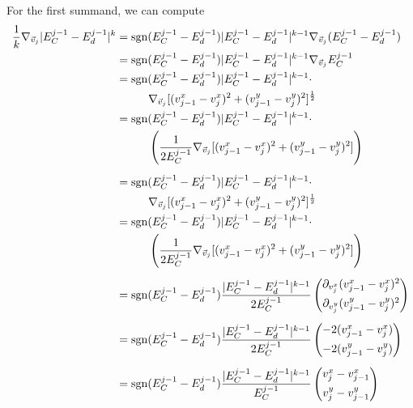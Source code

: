 \begin{proposition}
	For the first summand, we can compute 
	\begin{align*}
		\frac{1}{k} \nabla_{\vec{v}_{j}} |E^{j-1}_{C} - E^{j-1}_d|^k 
		&= \operatorname{sgn}(E^{j-1}_C - E^{j-1}_d) |E^{j-1}_C - E^{j-1}_d|^{k-1} \nabla_{\vec{v}_j} (E^{j-1}_C - E^{j-1}_d) \\
		&= \operatorname{sgn}(E^{j-1}_C - E^{j-1}_d) |E^{j-1}_C - E^{j-1}_d|^{k-1} \nabla_{\vec{v}_j} E^{j-1}_C \\
		&= \operatorname{sgn}(E^{j-1}_C - E^{j-1}_d) |E^{j-1}_C - E^{j-1}_d|^{k-1} \cdot\\
		& \hspace{1cm} \nabla_{\vec{v}_j} [(v_{j-1}^{x} - v_{j}^{x})^2 + (v_{j-1}^{y} - v_{j}^{y})^2]^{\frac{1}{2}}\\
		&= \operatorname{sgn}(E^{j-1}_C - E^{j-1}_d) |E^{j-1}_C - E^{j-1}_d|^{k-1} \cdot    \\
		& \hspace{1cm} \left(\frac{1}{2 E^{j-1}_C} \nabla_{\vec{v}_j} [(v_{j-1}^{x} - v_{j}^{x})^2 + (v_{j-1}^{y} - v_{j}^{y})^2]\right) \\[0.5em] 
		&= \operatorname{sgn}(E^{j-1}_C - E^{j-1}_d) |E^{j-1}_C - E^{j-1}_d|^{k-1} \cdot\\
		& \hspace{1cm} \nabla_{\vec{v}_j} [(v_{j-1}^{x} - v_{j}^{x})^2 + (v_{j-1}^{y} - v_{j}^{y})^2]^{\frac{1}{2}}\\
		&= \operatorname{sgn}(E^{j-1}_C - E^{j-1}_d) |E^{j-1}_C - E^{j-1}_d|^{k-1} \cdot    \\
		& \hspace{1cm} \left(\frac{1}{2 E^{j-1}_C} \nabla_{\vec{v}_j} [(v_{j-1}^{x} - v_{j}^{x})^2 + (v_{j-1}^{y} - v_{j}^{y})^2]\right) \\[0.5em] 
		&= \operatorname{sgn}(E^{j-1}_C - E^{j-1}_d) \frac{|E^{j-1}_C - E^{j-1}_d|^{k-1}}{2 E^{j-1}_C} \begin{pmatrix}
			\partial_{v_{j}^{x}} (v_{j-1}^{x} - v_{j}^{x})^2 \\[0.5em]
			\partial_{v_{j}^{y}} (v_{j-1}^{y} - v_{j}^{y})^2
		\end{pmatrix} \\[0.5em]
		&= \operatorname{sgn}(E^{j-1}_C - E^{j-1}_d) \frac{|E^{j-1}_C - E^{j-1}_d|^{k-1}}{2 E^{j-1}_C} \begin{pmatrix}
			 -2(v_{j-1}^{x} - v_{j}^{x}) \\[0.5em]
			 -2(v_{j-1}^{y} - v_{j}^{y})
		\end{pmatrix} \\[0.5em] 
		&= \operatorname{sgn}(E^{j-1}_C - E^{j-1}_d) \frac{ |E^{j-1}_C - E^{j-1}_d|^{k-1}}{E^{j-1}_C} \begin{pmatrix}
				v_{j}^{x} - v_{j-1}^{x} \\[0.5em]
				v_{j}^{y} - v_{j-1}^{y}
		\end{pmatrix}
	\end{align*}



\end{proposition}
